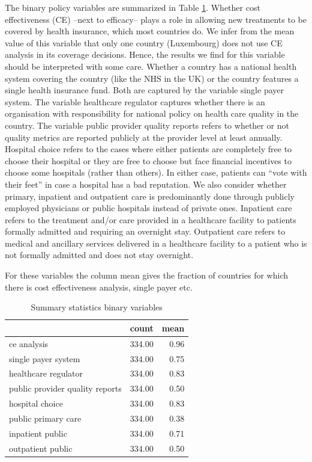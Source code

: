 \documentclass[a4paper,12pt]{article}
\begin{document}
The binary policy variables are summarized in Table \ref{tab:summary_policy_variables}. Whether cost effectiveness (CE) --next to efficacy-- plays a role in allowing new treatments to be covered by health insurance, which most countries do. We infer from the mean value of this variable that only one country (Luxembourg) does not use CE analysis in its coverage decisions. Hence, the results we find for this variable should be interpreted with some care. Whether a country has a national health system covering the country (like the NHS in the UK) or the country features a single health insurance fund. Both are captured by the variable single payer system. The variable healthcare regulator captures whether there is an organisation with responsibility for national policy on health care quality in the country. The variable public provider quality reports refers to whether or not quality metrics are reported publicly at the provider level at least annually. Hospital choice refers to the cases where either patients are completely free to choose their hospital or they are free to choose but face financial incentives to choose some hospitals (rather than others). In either case, patients can ``vote with their feet'' in case a hospital has a bad reputation. We also consider whether primary, inpatient and outpatient care is predominantly done through publicly employed physicians or public hospitals instead of private ones. Inpatient care refers to the treatment and/or care provided in a healthcare facility to patients formally admitted and requiring an overnight stay. Outpatient care refers to medical and ancillary services delivered in a healthcare facility to a patient who is not formally admitted and does not stay overnight.

For these variables the column mean gives the fraction of countries for which there is cost effectiveness analysis, single payer etc.

\begin{table}[htbp]
\caption{\label{tab:summary_policy_variables}Summary statistics binary variables}
\centering
\begin{tabular}{lrr}
 & count & mean\\
\hline
ce analysis & 334.00 & 0.96\\
single payer system & 334.00 & 0.75\\
healthcare regulator & 334.00 & 0.83\\
public provider quality reports & 334.00 & 0.50\\
hospital choice & 334.00 & 0.83\\
public primary care & 334.00 & 0.38\\
inpatient public & 334.00 & 0.71\\
outpatient public & 334.00 & 0.50\\
\end{tabular}
\end{table}
\end{document}
